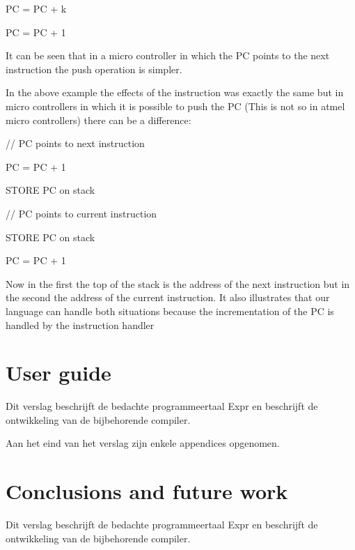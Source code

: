 \documentclass[a4paper]{article}
\begin{document}
\bigskip

{\ttfamily
PC = PC + k}


\bigskip

{\ttfamily
PC = PC + 1}

{\sffamily
It can be seen that in a micro controller in which the PC points to the
next instruction the push operation is simpler.}

{\sffamily
In the above example the effects of the instruction was exactly the same
but in micro controllers in which it is possible to push the PC (This
is not so in atmel micro controllers) there can be a difference:}

{\ttfamily
// PC points to next instruction}


\bigskip

{\ttfamily
PC = PC + 1}


\bigskip

{\ttfamily
STORE PC on stack}


\bigskip

{\ttfamily
// PC points to current instruction}


\bigskip

{\ttfamily
STORE PC on stack}


\bigskip

{\ttfamily
PC = PC + 1}

{\sffamily
Now in the first the top of the stack is the address of the next
instruction but in the second the address of the current instruction.
It also illustrates that our language can handle both situations
because the incrementation of the PC is handled by the instruction
handler}

\bigskip

\clearpage\section{User guide}
{\sffamily
Dit verslag beschrijft de bedachte programmeertaal Expr en beschrijft de
ontwikkeling van de bijbehorende compiler.}

{\sffamily
Aan het eind van het verslag zijn enkele appendices opgenomen. }

\section{}
\clearpage\section{Conclusions and future work}
{\sffamily
Dit verslag beschrijft de bedachte programmeertaal Expr en beschrijft de
ontwikkeling van de bijbehorende compiler.}
\end{document}
